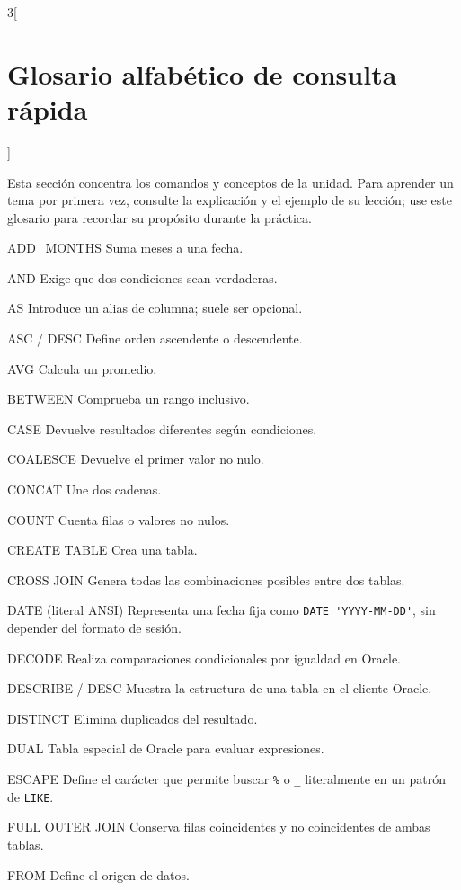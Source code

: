 \documentclass[10pt,letterpaper]{article}
\newif\ifintheorycolumns
\newcommand{\EndTheory}{%
  \ifintheorycolumns
    \global\intheorycolumnsfalse
    \end{multicols}%
  \fi}
\newenvironment{glossarylist}
  {\begin{description}[
    style=unboxed,
    leftmargin=0pt,
    labelindent=0pt,
    labelsep=0.45em,
    itemsep=0.18em,
    parsep=0pt,
    topsep=0.2em,
    font=\normalfont\ttfamily\bfseries]}
  {\end{description}}
\begin{document}
\EndTheory
\begin{multicols}{3}[\section{Glosario alfabético de consulta rápida}]
\small
\raggedright
Esta sección concentra los comandos y conceptos de la unidad. Para aprender un
tema por primera vez, consulte la explicación y el ejemplo de su lección; use
este glosario para recordar su propósito durante la práctica.

\begin{glossarylist}
\item[ADD\_MONTHS] Suma meses a una fecha.
\item[AND] Exige que dos condiciones sean verdaderas.
\item[AS] Introduce un alias de columna; suele ser opcional.
\item[ASC / DESC] Define orden ascendente o descendente.
\item[AVG] Calcula un promedio.
\item[BETWEEN] Comprueba un rango inclusivo.
\item[CASE] Devuelve resultados diferentes según condiciones.
\item[COALESCE] Devuelve el primer valor no nulo.
\item[CONCAT] Une dos cadenas.
\item[COUNT] Cuenta filas o valores no nulos.
\item[CREATE TABLE] Crea una tabla.
\item[CROSS JOIN] Genera todas las combinaciones posibles entre dos tablas.
\item[DATE (literal ANSI)] Representa una fecha fija como
\lstinline|DATE 'YYYY-MM-DD'|, sin depender del formato de sesión.
\item[DECODE] Realiza comparaciones condicionales por igualdad en Oracle.
\item[DESCRIBE / DESC] Muestra la estructura de una tabla en el cliente Oracle.
\item[DISTINCT] Elimina duplicados del resultado.
\item[DUAL] Tabla especial de Oracle para evaluar expresiones.
\item[ESCAPE] Define el carácter que permite buscar \texttt{\%} o
\texttt{\_} literalmente en un patrón de \lstinline|LIKE|.
\item[FULL OUTER JOIN] Conserva filas coincidentes y no coincidentes de ambas tablas.
\item[FROM] Define el origen de datos.

\end{glossarylist}
\end{multicols}
\end{document}
